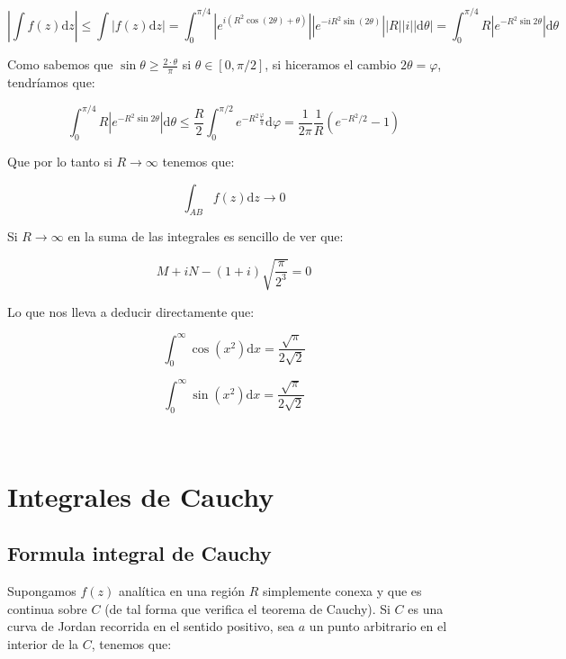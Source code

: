 \documentclass[12pt]{book}
\newcommand{\D}{\mathrm{d}}
\newcommand{\into}{\int_{0}^{\infty}}
\begin{document}
\begin{itemize}
$$ \left| \int f(z) \D z \right| \leq \int \left| f(z) \D z \right| = \int_{0}^{\pi/4} \left| e^{i(R^2 \cos ( 2 \theta) + \theta)}  \right| \left| e^{-i R^2 \sin(2 \theta)} \right| |R||i||\D \theta| = \int_0^{\pi/4} R \left| e^{-R^2 \sin 2 \theta} \right| \D \theta $$

Como sabemos que $\sin \theta  \geq \frac{2 \cdot \theta}{\pi}$ si $\theta \in [0,\pi/2]$, si hiceramos el cambio $2 \theta = \varphi$, tendríamos que:

$$ \int_0^{\pi/4} R \left| e^{-R^2 \sin 2 \theta} \right| \D \theta \leq \frac{R}{2} \int_0^{\pi/2} e^{-R^2 \frac{\varphi}{\pi}} \D \varphi = \dfrac{1}{2 \pi} \dfrac{1}{R} (e^{-R^2/2}-1)   $$

Que por lo tanto si $R \rightarrow \infty$ tenemos que:

$$ \int_{AB} f(z) \D z \rightarrow 0 $$


\end{itemize}

Si $R \rightarrow \infty$ en la suma de las integrales es sencillo de ver que:

$$ M + i N - (1+i)\sqrt{\dfrac{\pi}{2^3}} = 0  $$

Lo que nos lleva a deducir directamente que:

\begin{equation}
\into \cos (x^2) \D x = \dfrac{\sqrt{\pi}}{2 \sqrt{2}}
\end{equation}

\begin{equation}
\into \sin (x^2) \D x = \dfrac{\sqrt{\pi}}{2 \sqrt{2}}
\end{equation}


\hrulefill \\


\chapter{Integrales de Cauchy}

\section{Formula integral de Cauchy}

Supongamos $f(z)$ analítica en una región $R$ simplemente conexa y que es continua sobre $C$ (de tal forma que verifica el teorema de Cauchy). Si $C$ es una curva de Jordan recorrida en el sentido positivo, sea $a$ un punto arbitrario en el interior de la $C$, tenemos que: 
\end{document}
